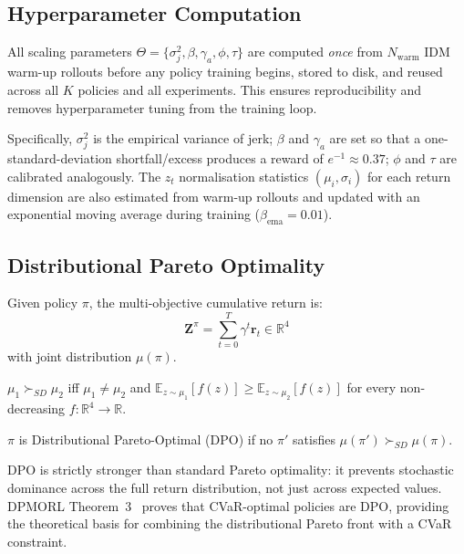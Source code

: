 \documentclass[conference]{IEEEtran}
\begin{document}
\subsection{Hyperparameter Computation}\label{sec:hyperparams}

All scaling parameters
$\Theta=\{\sigma_{j}^{2},\beta,\gamma_{a},\phi,\tau\}$
are computed \emph{once} from $N_{\text{warm}}$ IDM warm-up rollouts
before any policy training begins, stored to disk, and reused across all
$K$ policies and all experiments. This ensures reproducibility and
removes hyperparameter tuning from the training loop.

Specifically, $\sigma_{j}^{2}$ is the empirical variance of jerk;
$\beta$ and $\gamma_{a}$ are set so that a one-standard-deviation
shortfall/excess produces a reward of $e^{-1}\!\approx\!0.37$;
$\phi$ and $\tau$ are calibrated analogously.
The $z_{t}$ normalisation statistics $(\mu_{i},\sigma_{i})$ for each
return dimension are also estimated from warm-up rollouts and updated
with an exponential moving average during training
($\beta_{\text{ema}}=0.01$).

\subsection{Distributional Pareto Optimality}\label{sec:dpo}

Given policy $\pi$, the multi-objective cumulative return is:
\begin{equation}
\mathbf{Z}^{\pi}=\sum_{t=0}^{T}\gamma^{t}\mathbf{r}_{t}\in\mathbb{R}^{4}
\end{equation}
with joint distribution $\mu(\pi)$.

\begin{definition}
$\mu_{1}\!\succ_{\!SD}\!\mu_{2}$ iff $\mu_{1}\!\neq\!\mu_{2}$ and
$\mathbb{E}_{z\sim\mu_{1}}[f(z)]\geq\mathbb{E}_{z\sim\mu_{2}}[f(z)]$
for every non-decreasing $f:\mathbb{R}^{4}\!\to\!\mathbb{R}$.
\end{definition}

\begin{definition}
$\pi$ is Distributional Pareto-Optimal (DPO) if no $\pi'$ satisfies
$\mu(\pi')\succ_{\!SD}\mu(\pi)$.
\end{definition}

DPO is strictly stronger than standard Pareto optimality: it prevents
stochastic dominance across the full return distribution, not just
across expected values. DPMORL Theorem~3~\cite{DPMORL2023} proves that
CVaR-optimal policies are DPO, providing the theoretical basis for
combining the distributional Pareto front with a CVaR constraint.
\end{document}
